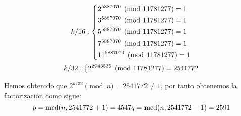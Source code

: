 \documentclass[fleqn]{article}
\begin{document}
    \begin{equation*}
        k/16: \left\{ \\
        \begin{aligned}
            &2^{5887070} \pmod{11781277} = 1 \\
            &3^{5887070} \pmod{11781277} = 1 \\
            &5^{5887070} \pmod{11781277} = 1 \\
            &7^{5887070} \pmod{11781277} = 1 \\
            &11^{5887070} \pmod{11781277} = 1 \\
        \end{aligned} \right.
    \end{equation*}
    \begin{equation*}
        k/32: \left\{ \\
        \begin{aligned}
            &2^{2943535} \pmod{11781277} = 2541772 \\
        \end{aligned} \right.
    \end{equation*}

    Hemos obtenido que $2^{k/32} \pmod{n} = 2541772 \neq 1$, por tanto obtenemos la factorización como sigue:
    \begin{equation*}
        p = \text{mcd} (n, 2541772 + 1) = 4547 \\
        q = \text{mcd} (n, 2541772 - 1) = 2591 
    \end{equation*}
\end{document}
